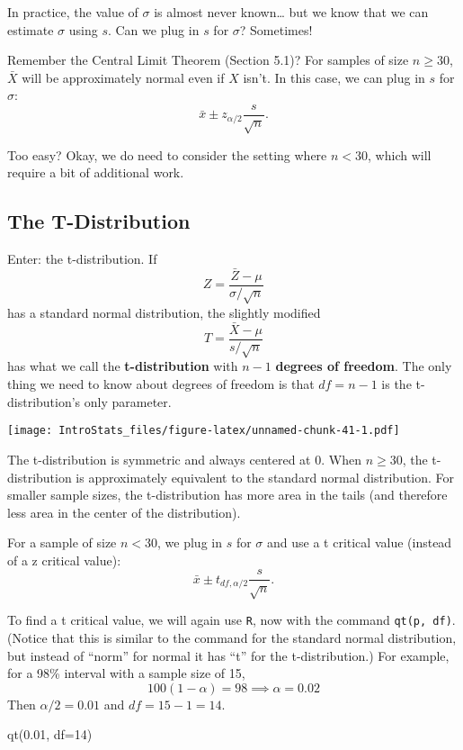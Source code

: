 \documentclass[
]{book}
\newenvironment{Shaded}{\begin{snugshade}}{\end{snugshade}}
\newcommand{\AttributeTok}[1]{\textcolor[rgb]{0.77,0.63,0.00}{#1}}
\newcommand{\DecValTok}[1]{\textcolor[rgb]{0.00,0.00,0.81}{#1}}
\newcommand{\FloatTok}[1]{\textcolor[rgb]{0.00,0.00,0.81}{#1}}
\newcommand{\FunctionTok}[1]{\textcolor[rgb]{0.00,0.00,0.00}{#1}}
\newcommand{\NormalTok}[1]{#1}
\begin{document}
In practice, the value of \(\sigma\) is almost never known\ldots{} but we know that we can estimate \(\sigma\) using \(s\). Can we plug in \(s\) for \(\sigma\)? Sometimes!

Remember the Central Limit Theorem (Section 5.1)? For samples of size \(n \ge 30\), \(\bar{X}\) will be approximately normal even if \(X\) isn't. In this case, we can plug in \(s\) for \(\sigma\): \[\bar{x} \pm z_{\alpha/2}\frac{s}{\sqrt{n}}.\]

Too easy? Okay, we do need to consider the setting where \(n < 30\), which will require a bit of additional work.

\hypertarget{the-t-distribution}{%
\subsection{The T-Distribution}\label{the-t-distribution}}

Enter: the t-distribution. If \[Z = \frac{\bar{Z}-\mu}{\sigma/\sqrt{n}}\] has a standard normal distribution, the slightly modified \[T = \frac{\bar{X}-\mu}{s/\sqrt{n}}\] has what we call the \textbf{t-distribution} with \(n-1\) \textbf{degrees of freedom}. The only thing we need to know about degrees of freedom is that \(df=n-1\) is the t-distribution's only parameter.

\texttt{[image: IntroStats\_files/figure-latex/unnamed-chunk-41-1.pdf]}

The t-distribution is symmetric and always centered at 0. When \(n\ge30\), the t-distribution is approximately equivalent to the standard normal distribution. For smaller sample sizes, the t-distribution has more area in the tails (and therefore less area in the center of the distribution).

For a sample of size \(n < 30\), we plug in \(s\) for \(\sigma\) and use a t critical value (instead of a z critical value): \[\bar{x} \pm t_{df, \alpha/2}\frac{s}{\sqrt{n}}.\]

To find a t critical value, we will again use \texttt{R}, now with the command \texttt{qt(p,\ df)}. (Notice that this is similar to the command for the standard normal distribution, but instead of ``norm'' for normal it has ``t'' for the t-distribution.) For example, for a 98\% interval with a sample size of 15, \[100(1-\alpha) = 98 \implies \alpha=0.02\] Then \(\alpha/2 = 0.01\) and \(df=15-1=14\).

\begin{Shaded}
\begin{Highlighting}[]
\FunctionTok{qt}\NormalTok{(}\FloatTok{0.01}\NormalTok{, }\AttributeTok{df=}\DecValTok{14}\NormalTok{)}
\end{Highlighting}
\end{Shaded}
\end{document}
